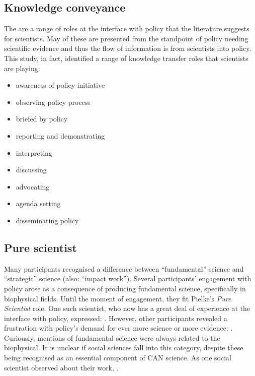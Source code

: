 \subsection{Knowledge conveyance}\label{sec:disknowrole}
The are a range of roles at the interface with policy that the literature suggests for scientists. May of these are presented from the standpoint of policy needing scientific evidence and thus the flow of information is from scientists into policy. This study, in fact, identified a range of knowledge transfer roles that scientists are playing:
\begin{itemize}
    \item awareness of policy initiative
    \item observing policy process
    \item briefed by policy
    \item reporting and demonstrating
    \item interpreting
    \item discussing
    \item advocating
    \item agenda setting
    \item disseminating policy
\end{itemize}

\subsection{Pure scientist}
Many participants recognised a difference between ``fundamental'' science and ``strategic'' science (also: ``impact work''). Several participants' engagement with policy arose as a consequence of producing fundamental science, specifically in biophysical fields. Until the moment of engagement, they fit Pielke's \emph{Pure Scientist} role.  One such scientist, who now has a great deal of experience at the interface with policy, expressed: . However, other participants revealed a frustration with policy's demand for ever more science or more evidence: .
Curiously, mentions of fundamental science were always related to the biophysical. It is unclear if social sciences fall into this category, despite these being recognised as an essential component of CAN science. As one social scientist observed about their work, .

